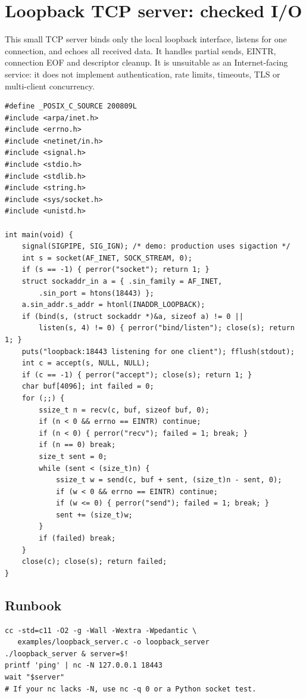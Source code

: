 \documentclass[11pt,letterpaper,oneside]{report}
\begin{document}
\chapter{Loopback TCP server: checked I/O}
This small TCP server binds only the local loopback interface, listens for one connection, and echoes all received data. It handles partial sends, EINTR, connection EOF and descriptor cleanup. It is unsuitable as an Internet-facing service: it does not implement authentication, rate limits, timeouts, TLS or multi-client concurrency.

\begin{lstlisting}
#define _POSIX_C_SOURCE 200809L
#include <arpa/inet.h>
#include <errno.h>
#include <netinet/in.h>
#include <signal.h>
#include <stdio.h>
#include <stdlib.h>
#include <string.h>
#include <sys/socket.h>
#include <unistd.h>

int main(void) {
    signal(SIGPIPE, SIG_IGN); /* demo: production uses sigaction */
    int s = socket(AF_INET, SOCK_STREAM, 0);
    if (s == -1) { perror("socket"); return 1; }
    struct sockaddr_in a = { .sin_family = AF_INET,
        .sin_port = htons(18443) };
    a.sin_addr.s_addr = htonl(INADDR_LOOPBACK);
    if (bind(s, (struct sockaddr *)&a, sizeof a) != 0 ||
        listen(s, 4) != 0) { perror("bind/listen"); close(s); return 1; }
    puts("loopback:18443 listening for one client"); fflush(stdout);
    int c = accept(s, NULL, NULL);
    if (c == -1) { perror("accept"); close(s); return 1; }
    char buf[4096]; int failed = 0;
    for (;;) {
        ssize_t n = recv(c, buf, sizeof buf, 0);
        if (n < 0 && errno == EINTR) continue;
        if (n < 0) { perror("recv"); failed = 1; break; }
        if (n == 0) break;
        size_t sent = 0;
        while (sent < (size_t)n) {
            ssize_t w = send(c, buf + sent, (size_t)n - sent, 0);
            if (w < 0 && errno == EINTR) continue;
            if (w <= 0) { perror("send"); failed = 1; break; }
            sent += (size_t)w;
        }
        if (failed) break;
    }
    close(c); close(s); return failed;
}
\end{lstlisting}
\section{Runbook}
\begin{lstlisting}
cc -std=c11 -O2 -g -Wall -Wextra -Wpedantic \
   examples/loopback_server.c -o loopback_server
./loopback_server & server=$!
printf 'ping' | nc -N 127.0.0.1 18443
wait "$server"
# If your nc lacks -N, use nc -q 0 or a Python socket test.
\end{lstlisting}
\end{document}
